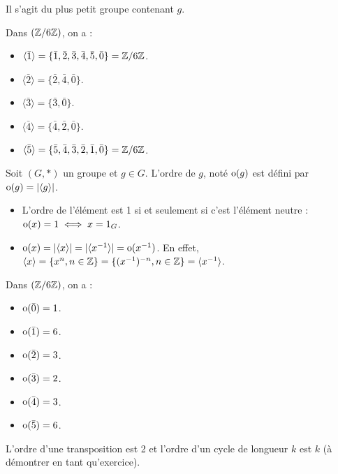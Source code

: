 \documentclass[11pt,a4paper]{report}
\begin{document}
\begin{property}
    Il s'agit du plus petit groupe contenant $g$.
\end{property}

\begin{example}
    Dans $(\mathbb{Z}/6\mathbb{Z})$, on a :
    \begin{itemize}
        \item $\langle \bar 1 \rangle = \{ \bar 1, \bar 2, \bar 3, \bar 4, \bar 5, \bar 0 \} = \mathbb{Z}/6\mathbb{Z}$.
        \item $\langle \bar 2 \rangle = \{ \bar 2, \bar 4, \bar 0 \}$.
        \item $\langle \bar 3 \rangle = \{ \bar 3, \bar 0 \}$.
        \item $\langle \bar 4 \rangle = \{ \bar 4, \bar 2, \bar 0 \}$.
        \item $\langle \bar 5 \rangle = \{ \bar 5, \bar 4, \bar 3, \bar 2, \bar 1, \bar 0 \} = \mathbb{Z}/6\mathbb{Z}$.
    \end{itemize}
\end{example}

\begin{definition}
    Soit $(G,*)$ un groupe et $g \in G$. L'ordre de $g$, noté $\mathrm{o}(g)$ est défini par $\mathrm{o}(g) = |\langle g \rangle|$.
\end{definition}

\begin{remark}
    \begin{itemize}
        \item L'ordre de l'élément est 1 si et seulement si c'est l'élément neutre : $\mathrm{o}(x) = 1 \iff x = 1_G$.
        \item $\mathrm{o}(x) = |\langle x \rangle| = |\langle x^{-1} \rangle| = \mathrm{o}(x^{-1})$. En effet, $\langle x \rangle = \{ x^n, n \in \mathbb{Z} \} = \{ (x^{-1})^{-n}, n \in \mathbb{Z} \} = \langle x^{-1} \rangle$.
    \end{itemize}
\end{remark}

\begin{example}
    Dans $(\mathbb{Z}/6\mathbb{Z})$, on a :
    \begin{itemize}
        \item $\mathrm{o}(\bar 0) = 1$.
        \item $\mathrm{o}(\bar 1) = 6$.
        \item $\mathrm{o}(\bar 2) = 3$.
        \item $\mathrm{o}(\bar 3) = 2$.
        \item $\mathrm{o}(\bar 4) = 3$.
        \item $\mathrm{o}(\bar 5) = 6$.
    \end{itemize}
    L'ordre d'une transposition est 2 et l'ordre d'un cycle de longueur $k$ est $k$ (à démontrer en tant qu'exercice).
\end{example}
\end{document}
